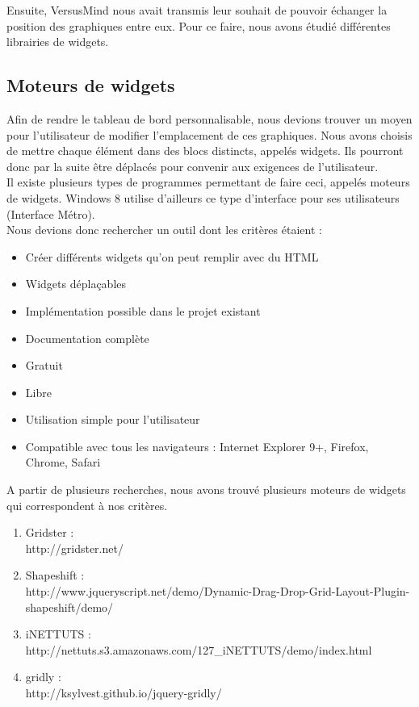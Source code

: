 \documentclass[12pt]{report}
\begin{document}
Ensuite, VersusMind nous avait transmis leur souhait de pouvoir échanger la position des graphiques entre eux. Pour ce faire, nous avons étudié différentes librairies de widgets.\\

		\subsection{Moteurs de widgets}
		
Afin de rendre le tableau de bord personnalisable, nous devions trouver un moyen pour l’utilisateur de modifier l’emplacement de ces graphiques. Nous avons choisis de mettre chaque élément dans des blocs distincts, appelés widgets. Ils pourront donc par la suite être déplacés pour convenir aux exigences de l’utilisateur.\\

Il existe plusieurs types de programmes permettant de faire ceci, appelés moteurs de widgets. Windows 8 utilise d’ailleurs ce type d’interface pour ses utilisateurs (Interface Métro).\\

Nous devions donc rechercher un outil dont les critères étaient :
\begin{itemize}
	\item Créer différents widgets qu’on peut remplir avec du HTML
	\item Widgets déplaçables
	\item Implémentation possible dans le projet existant
	\item Documentation complète
	\item Gratuit
	\item Libre
	\item Utilisation simple pour l’utilisateur
	\item Compatible avec tous les navigateurs : Internet Explorer 9+, Firefox, Chrome, Safari
\end{itemize}

A partir de plusieurs recherches, nous avons trouvé plusieurs moteurs de widgets qui correspondent à nos critères.
\begin{enumerate}
\item Gridster : \\http://gridster.net/ 
\item Shapeshift : \\http://www.jqueryscript.net/demo/Dynamic-Drag-Drop-Grid-Layout-Plugin-shapeshift/demo/
\item iNETTUTS : \\http://nettuts.s3.amazonaws.com/127\_iNETTUTS/demo/index.html
\item gridly : \\http://ksylvest.github.io/jquery-gridly/
\end{enumerate}
	
\end{document}
